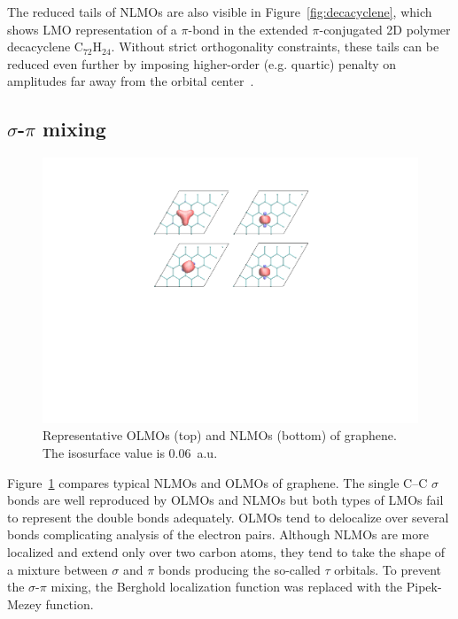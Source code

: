 \documentclass[aps,prl,reprint,amsmath,amssymb]{revtex4-1}
\begin{document}
The reduced tails of NLMOs are also visible in Figure~\ref{fig:decacyclene}, which shows LMO representation of a $\pi$-bond in the extended $\pi$-conjugated 2D polymer decacyclene C$_{72}$H$_{24}$. Without strict orthogonality constraints, these tails can be reduced even further by imposing higher-order (e.g. quartic) penalty on amplitudes far away from the orbital center~\cite{hoyvik2012orbital}.

\subsection{$\sigma$-$\pi$ mixing}

\begin{figure}[hbpt]
\centering
\includegraphics[scale=0.6]{graphene.pdf}
\caption{Representative OLMOs (top) and NLMOs (bottom) of graphene. The isosurface value is 0.06~a.u.
}
\label{fig:graphene}
\end{figure}

Figure~\ref{fig:graphene} compares typical NLMOs and OLMOs of graphene. 
The single C--C $\sigma$ bonds are well reproduced by OLMOs and NLMOs but both types of LMOs fail to represent the double bonds adequately.  OLMOs tend to delocalize over several bonds complicating analysis of the electron pairs. Although NLMOs are more localized and extend only over two carbon atoms, they tend to take the shape of a mixture between $\sigma$ and $\pi$ bonds producing the so-called $\tau$ orbitals. To prevent the $\sigma$-$\pi$ mixing, the Berghold localization function was replaced with the Pipek-Mezey function. 
\end{document}
